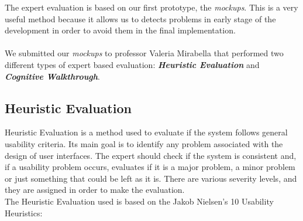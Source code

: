 \documentclass[12pt, a4paper]{article}
\numberwithin{figure}{section}
\begin{document}
The expert evaluation is based on our first prototype, the \textit{mockups}. This is a very useful method because
it allows us to detects problems in early stage of the development in order to avoid them in the final implementation.\\\\
We submitted our \textit{mockups} to professor Valeria Mirabella that performed two different types of expert based evaluation:
\textbf{\textit{Heuristic Evaluation}} and \textbf{\textit{Cognitive Walkthrough}}.

\subsection{Heuristic Evaluation}

Heuristic Evaluation is a method used to evaluate if the system follows general usability criteria. Its main goal is to identify any problem associated with the design of user interfaces.
The expert should check if the system is consistent and, if a usability problem occurs, evaluates if it is a major problem,
a minor problem or just something that could be left as it is.
There are various severity levels, and they are assigned in order to make the evaluation.\\
The Heuristic Evaluation used is based on the Jakob Nielsen’s 10 Usability Heuristics:
\end{document}
